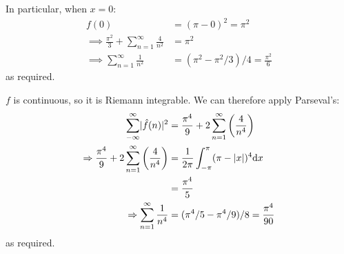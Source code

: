\documentclass[a4paper, 12pt]{article}
\begin{document}
\begin{solution}
    In particular, when $x = 0$: \begin{align*}
        f(0) &= (\pi - 0)^2 = \pi^2 \\
        \implies \frac{\pi^2}{3} + \sum_{n=1}^{\infty} \frac{4}{n^2}     &= \pi^2 \\
        \implies \sum_{n=1}^{\infty} \frac{1}{n^2} &= (\pi^2 - \pi^2/3)/4 = \frac{\pi^2}{6}
    \end{align*}
    as required.

    $f$ is continuous, so it is Riemann integrable. We can therefore apply Parseval's: \begin{align*}
        \sum_{-\infty}^{\infty} \lvert\hat{f}(n)\rvert^2 &= \frac{\pi^4}{9} + 2 \sum_{n=1}^{\infty} \left(\frac{4}{n^4}\right) \\
        \Rightarrow \frac{\pi^4}{9} + 2 \sum_{n=1}^{\infty} \left(\frac{4}{n^4}\right)  &= \frac{1}{2\pi} \int_{-\pi}^{\pi} (\pi - \lvert x\rvert)^4 \mathrm{d} x \\
        &= \frac{\pi^4}{5}   \\
        \Rightarrow \sum_{n=1}^{\infty} \frac{1}{n^4} &= (\pi^4/5 - \pi^4/9)/8 = \frac{\pi^4}{90}
    \end{align*}
    as required.
\end{solution}
\end{document}
